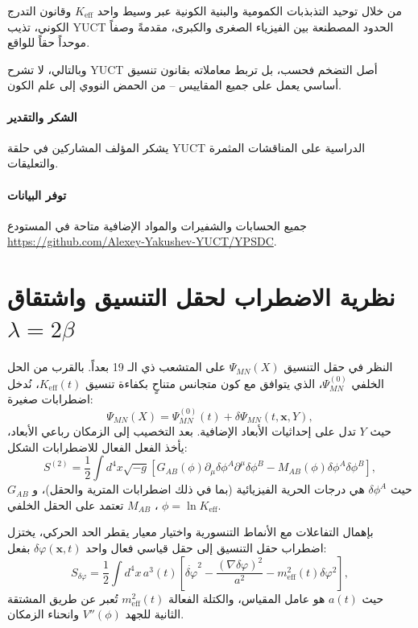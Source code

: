 \documentclass[11pt,a4paper]{article}
\theoremstyle{remark}
\newcommand{\Keff}{K_{\mathrm{eff}}}
\begin{document}
	من خلال توحيد التذبذبات الكمومية والبنية الكونية عبر وسيط واحد $K_{\mathrm{eff}}$ وقانون التدرج الكوني، تذيب YUCT الحدود المصطنعة بين الفيزياء الصغرى والكبرى، مقدمةً وصفاً موحداً حقاً للواقع.
	
	وبالتالي، لا تشرح YUCT أصل التضخم فحسب، بل تربط معاملاته بقانون تنسيق أساسي يعمل على جميع المقاييس – من الحمض النووي إلى علم الكون.
	
	\paragraph*{الشكر والتقدير}
	يشكر المؤلف المشاركين في حلقة YUCT الدراسية على المناقشات المثمرة والتعليقات.
	
	\paragraph*{توفر البيانات}
	جميع الحسابات والشفيرات والمواد الإضافية متاحة في المستودع \url{https://github.com/Alexey-Yakushev-YUCT/YPSDC}.
	
	\appendix
	\section{نظرية الاضطراب لحقل التنسيق واشتقاق $\lambda = 2\beta$}
	\label{app:perturbations}
	
	النظر في حقل التنسيق $\Psi_{MN}(X)$ على المتشعب ذي الـ 19 بعداً. بالقرب من الحل الخلفي $\Psi^{(0)}_{MN}$، الذي يتوافق مع كون متجانس متناحٍ بكفاءة تنسيق $\Keff(t)$، نُدخل اضطرابات صغيرة:
	\begin{equation}
		\Psi_{MN}(X) = \Psi^{(0)}_{MN}(t) + \delta\Psi_{MN}(t,\mathbf{x},Y),
	\end{equation}
	حيث $Y$ تدل على إحداثيات الأبعاد الإضافية. بعد التخصيب إلى الزمكان رباعي الأبعاد، يأخذ الفعل الفعال للاضطرابات الشكل:
	\begin{equation}
		S^{(2)} = \frac{1}{2} \int d^4x \sqrt{-g} \left[ G_{AB}(\phi) \partial_\mu \delta\phi^A \partial^\mu \delta\phi^B - M_{AB}(\phi) \delta\phi^A \delta\phi^B \right],
	\end{equation}
	حيث $\delta\phi^A$ هي درجات الحرية الفيزيائية (بما في ذلك اضطرابات المترية والحقل)، و $G_{AB}$، $M_{AB}$ تعتمد على الحقل الخلفي $\phi = \ln\Keff$.
	
	بإهمال التفاعلات مع الأنماط التنسورية واختيار معيار يقطر الحد الحركي، يختزل اضطراب حقل التنسيق إلى حقل قياسي فعال واحد $\delta\varphi(\mathbf{x},t)$ بفعل:
	\begin{equation}
		S_{\delta\varphi} = \frac{1}{2} \int d^4x \, a^3(t) \left[ \dot{\delta\varphi}^2 - \frac{(\nabla\delta\varphi)^2}{a^2} - m_{\mathrm{eff}}^2(t) \delta\varphi^2 \right],
	\end{equation}
	حيث $a(t)$ هو عامل المقياس، والكتلة الفعالة $m_{\mathrm{eff}}^2(t)$ تُعبر عن طريق المشتقة الثانية للجهد $V''(\phi)$ وانحناء الزمكان.
	
\end{document}
